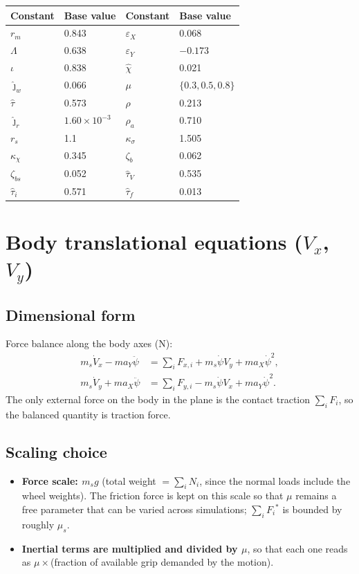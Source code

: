 \documentclass[11pt]{article}
\newcommand{\st}[1]{{#1}^{*}}
\begin{document}
\medskip
\begin{tabular}{@{}llll@{}}
\toprule
Constant & Base value & Constant & Base value \\
\midrule
$r_m$ & 0.843 & $\varepsilon_X$ & 0.068 \\
$\Lambda$ & 0.638 & $\varepsilon_Y$ & $-0.173$ \\
$\iota$ & 0.838 & $\hat\chi$ & 0.021 \\
$\hat\jmath_w$ & 0.066 & $\mu$ & $\{0.3, 0.5, 0.8\}$ \\
$\hat\tau$ & 0.573 & $\rho$ & 0.213 \\
$\hat\jmath_r$ & $1.60\times10^{-3}$ & $\rho_a$ & 0.710 \\
$r_s$ & 1.1 & $\kappa_\sigma$ & 1.505 \\
$\kappa_\chi$ & 0.345 & $\zeta_b$ & 0.062 \\
$\zeta_{bs}$ & 0.052 & $\hat\tau_V$ & 0.535 \\
$\hat\tau_i$ & 0.571 & $\hat\tau_f$ & 0.013 \\
\bottomrule
\end{tabular}

\section{Body translational equations ($V_x$, $V_y$)}

\subsection{Dimensional form}
Force balance along the body axes (N):
\begin{align}
m_s\dot V_x - m a_Y\ddot\psi &= \textstyle\sum_i F_{x,i}
  + m_s\dot\psi V_y + m a_X\dot\psi^2, \label{eq:x}\\
m_s\dot V_y + m a_X\ddot\psi &= \textstyle\sum_i F_{y,i}
  - m_s\dot\psi V_x + m a_Y\dot\psi^2. \label{eq:y}
\end{align}
The only external force on the body in the plane is the contact traction
$\sum_i F_i$, so the balanced quantity is traction force.

\subsection{Scaling choice}
\begin{itemize}
  \item \textbf{Force scale: $m_s g$} (total weight $= \sum_i N_i$, since the
    normal loads include the wheel weights). The friction force is kept on this
    scale so that $\mu$ remains a free parameter that can be varied across
    simulations; $\sum_i \st{F_i}$ is bounded by roughly $\mu_s$.
  \item \textbf{Inertial terms are multiplied and divided by $\mu$}, so that
    each one reads as $\mu\times$(fraction of available grip demanded by the
    motion).
\end{itemize}
\end{document}
